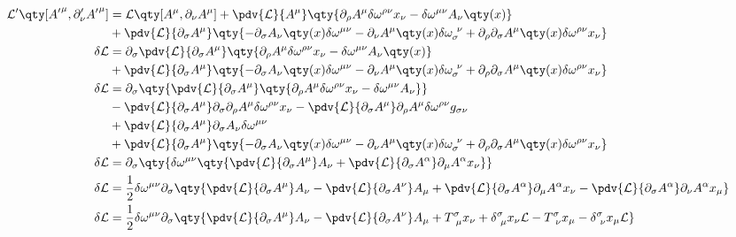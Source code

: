 \documentclass[twoside]{amsart}
\numberwithin{equation}{section}
\begin{document}
\begin{refsection}
\begin{align}
    \mathcal L'\qty[{A'}^\mu,\partial_\nu' {A'}^\mu]&=\mathcal L\qty[A^\mu,\partial_\nu A^\mu]+\pdv{\mathcal L}{A^\mu}\qty{\partial_\rho A^\mu\delta\omega^{\rho\nu}x_\nu-\delta\omega^{\mu\nu}A_\nu\qty(x)}\\
    &+\pdv{\mathcal L}{\partial_\sigma A^\mu}\qty{-\partial_\sigma A_\nu\qty(x)\delta\omega^{\mu\nu}-\partial_\nu A^\mu\qty(x)\delta\omega_{\sigma}^{\ \nu}+\partial_\rho\partial_\sigma A^\mu\qty(x)\delta\omega^{\rho\nu}x_\nu}\\
    \delta\mathcal L&=\partial_\sigma\pdv{\mathcal L}{\partial_\sigma A^\mu}\qty{\partial_\rho A^\mu\delta\omega^{\rho\nu}x_\nu-\delta\omega^{\mu\nu}A_\nu\qty(x)}\\
    &+\pdv{\mathcal L}{\partial_\sigma A^\mu}\qty{-\partial_\sigma A_\nu\qty(x)\delta\omega^{\mu\nu}-\partial_\nu A^\mu\qty(x)\delta\omega_{\sigma}^{\ \nu}+\partial_\rho\partial_\sigma A^\mu\qty(x)\delta\omega^{\rho\nu}x_\nu}\\
    \delta\mathcal L&=\partial_\sigma\qty{\pdv{\mathcal L}{\partial_\sigma A^\mu}\qty{\partial_\rho A^\mu\delta\omega^{\rho\nu}x_\nu-\delta\omega^{\mu\nu}A_\nu}}\\
    &-\pdv{\mathcal L}{\partial_\sigma A^\mu}\partial_\sigma\partial_\rho A^\mu\delta\omega^{\rho\nu}x_\nu-\pdv{\mathcal L}{\partial_\sigma A^\mu}\partial_\rho A^\mu\delta\omega^{\rho\nu}g_{\sigma\nu}\\
    &+\pdv{\mathcal L}{\partial_\sigma A^\mu}\partial_\sigma A_\nu\delta\omega^{\mu\nu}\\
    &+\pdv{\mathcal L}{\partial_\sigma A^\mu}\qty{-\partial_\sigma A_\nu\qty(x)\delta\omega^{\mu\nu}-\partial_\nu A^\mu\qty(x)\delta\omega_{\sigma}^{\ \nu}+\partial_\rho\partial_\sigma A^\mu\qty(x)\delta\omega^{\rho\nu}x_\nu}\\
    \delta\mathcal L&=\partial_\sigma\qty{\delta\omega^{\mu\nu}\qty{\pdv{\mathcal L}{\partial_\sigma A^\mu}A_\nu+\pdv{\mathcal L}{\partial_\sigma A^\alpha}\partial_\mu A^\alpha x_\nu}}\\
    \delta\mathcal L&=\frac12\delta\omega^{\mu\nu}\partial_\sigma\qty{\pdv{\mathcal L}{\partial_\sigma A^\mu}A_\nu-\pdv{\mathcal L}{\partial_\sigma A^\nu}A_\mu+\pdv{\mathcal L}{\partial_\sigma A^\alpha}\partial_\mu A^\alpha x_\nu-\pdv{\mathcal L}{\partial_\sigma A^\alpha}\partial_\nu A^\alpha x_\mu}\\
    \delta\mathcal L&=\frac12\delta\omega^{\mu\nu}\partial_\sigma\qty{\pdv{\mathcal L}{\partial_\sigma A^\mu}A_\nu-\pdv{\mathcal L}{\partial_\sigma A^\nu}A_\mu+T^{\sigma}_{\ \mu}x_\nu+\delta^{\sigma}_{\ \mu}x_\nu\mathcal L-T^{\sigma}_{\ \nu}x_\mu-\delta^{\sigma}_{\ \nu}x_\mu\mathcal L}
\end{align}


\end{refsection}
\end{document}
